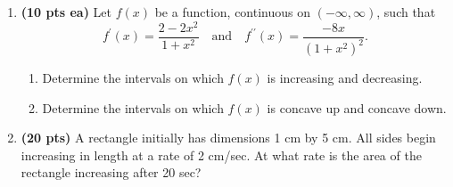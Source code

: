 \documentclass[12pt]{article}
\begin{document}
\begin{enumerate}
\newpage
\item {\bf (10 pts ea)} Let $f(x)$ be a function, continuous on $(-\infty,\infty)$, such that 
\[
f^{\prime}(x)=\frac{2-2x^2}{1+x^2} %
\quad\text{and}\quad 
f^{\prime\prime}(x)=\frac{-8x}{(1+x^2)^2}. %
\]
\begin{enumerate}
	\item Determine the intervals on which $f(x)$ is increasing and decreasing.
	\vspace{14pc}

	\item Determine the intervals on which $f(x)$ is concave up and concave down.
\end{enumerate}

\newpage
%
\item {\bf (20 pts)} A rectangle initially has dimensions 1 cm by 5 cm.  All sides begin increasing in length at a rate of 2 cm/sec.  At what rate is the area of the rectangle increasing after 20 sec? %

\end{enumerate}
\end{document}
